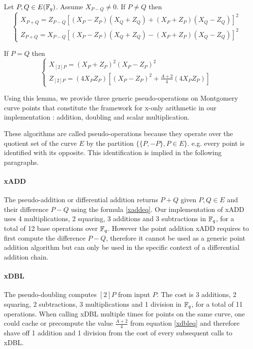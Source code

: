 \documentclass[../main.tex]{subfiles}
\begin{document}
\begin{lemma}Let $P,Q\in E(\mathbb{F}_q)$.  Assume $X_{P-Q}\neq0$.
	 If $P\neq Q$ then  \begin{equation}\label{xaddeq}\left\{\begin{array}{l}
	 	X_{P+Q} = Z_{P-Q}[(X_P-Z_P)(X_Q+Z_Q) + (X_P+Z_P)(X_Q-Z_Q)]^2\\
	 	Z_{P+Q} = X_{P-Q}[(X_P-Z_P)(X_Q+Z_Q) - (X_P+Z_P)(X_Q-Z_Q)]^2
	 \end{array}\right.\end{equation}

 	If $P=Q$ then \begin{equation}\label{xdbleq}\left\{\begin{array}{l}
 		X_{[2]P}=(X_P + Z_P)^2(X_P - Z_P)^2 \\
 		Z_{[2]P}=(4 X_P Z_P)[(X_P - Z_P)^2 + \frac{A+2}{4}(4 X_P Z_P)]
 	\end{array}\right.\end{equation}
\end{lemma}

Using this lemma, we provide three generic pseudo-operations on Montgomery curve points that constitute the framework for x-only arithmetic in our implementation : addition, doubling and scalar multiplication.

These algorithms are called pseudo-operations because they operate over the quotient set of the curve $E$ by the partition
$\lbrace\lbrace P, -P\rbrace, P\in E\rbrace$. e.g. every point is identified with its opposite. This identification is implied in the following paragraphs.

\paragraph{xADD}The pseudo-addition or differential addition  returns $P+Q$ given $P,Q\in E$ and their difference $P-Q$ using the formula \eqref{xaddeq}.
Our implementation of xADD uses 4 multiplications, 2 squaring,  3 additions and 3 subtractions in $\mathbb{F}_q$, for a total of  12 base operations over $\mathbb{F}_q$.
However the point addition xADD requires to first compute the difference $P-Q$, therefore it cannot be used as a generic point addition algorithm but can only be used in the specific context of a differential addition chain.

\paragraph{xDBL}The pseudo-doubling  computes $[2]P$ from input $P$.  The cost is 3 additions, 2 squaring, 2 subtractions, 3 multiplications and 1 division in $\mathbb{F}_q$, for a total of 11 operations. When calling xDBL multiple times for points on the same curve, one could cache or precompute the value $\frac{A+2}{4}$ from equation \eqref{xdbleq} and therefore shave off 1 addition and 1 division from the cost of every subsequent calls to xDBL.
\end{document}
